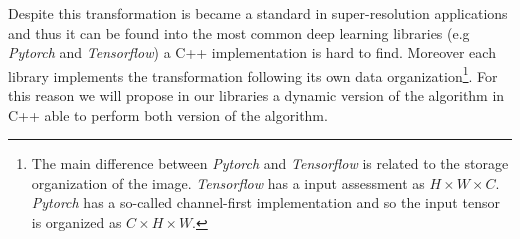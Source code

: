 \documentclass{standalone}
\begin{document}
Despite this transformation is became a standard in super-resolution applications and thus it can be found into the most common deep learning libraries (e.g \emph{Pytorch} and \emph{Tensorflow}) a C++ implementation is hard to find.
Moreover each library implements the transformation following its own data organization\footnote{
  The main difference between \emph{Pytorch} and \emph{Tensorflow} is related to the storage organization of the image.
  \emph{Tensorflow} has a  input assessment as $H \times W \times C$.
  \emph{Pytorch} has a so-called channel-first implementation and so the input tensor is organized as $C \times H \times W$.
}.
For this reason we will propose in our libraries a dynamic version of the algorithm in C++ able to perform both version of the algorithm.
\end{document}
